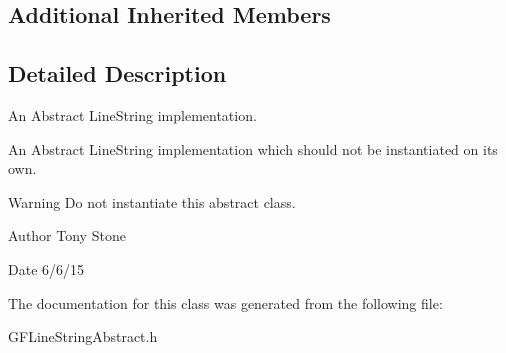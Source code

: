 \subsection*{Additional Inherited Members}


\subsection{Detailed Description}
An Abstract Line\+String implementation. 

An Abstract Line\+String implementation which should not be instantiated on it\textquotesingle{}s own.

\begin{DoxyWarning}{Warning}
Do not instantiate this abstract class.
\end{DoxyWarning}
\begin{DoxyAuthor}{Author}
Tony Stone 
\end{DoxyAuthor}
\begin{DoxyDate}{Date}
6/6/15 
\end{DoxyDate}


The documentation for this class was generated from the following file\+:\begin{DoxyCompactItemize}
\item 
G\+F\+Line\+String\+Abstract.\+h\end{DoxyCompactItemize}
